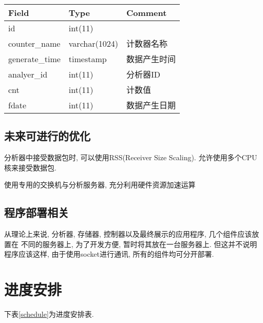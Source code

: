 {\begin{mdframed}[everyline=true]
\begin{center}
    \label{tbl_counter}
    \begin{tabular}{lll} \hline
    Field          & Type          & Comment \\ \hline
    id             & int(11)       &         \\
    counter\_name  & varchar(1024) & 计数器名称   \\
    generate\_time & timestamp     & 数据产生时间  \\
    analyer\_id    & int(11)       & 分析器ID   \\
    cnt            & int(11)       & 计数值     \\
    fdate          & int(11)       & 数据产生日期  \\ \hline
    \end{tabular}
\end{center}



\subsection{未来可进行的优化}

分析器中接受数据包时, 可以使用RSS(Receiver Size Scaling).
允许使用多个CPU 核来接受数据包.

使用专用的交换机与分析服务器, 充分利用硬件资源加速运算

\subsection{程序部署相关}

从理论上来说, 分析器, 存储器, 控制器以及最终展示的应用程序,
几个组件应该放置在 不同的服务器上, 为了开发方便,
暂时将其放在一台服务器上. 但这并不说明程序应该这样,
由于使用socket进行通讯, 所有的组件均可分开部署.


\section{进度安排}

 下表\ref{schedule}为进度安排表.

\begin{centering}
\centering
    \label{schedule}


\end{centering}
\end{mdframed}}
